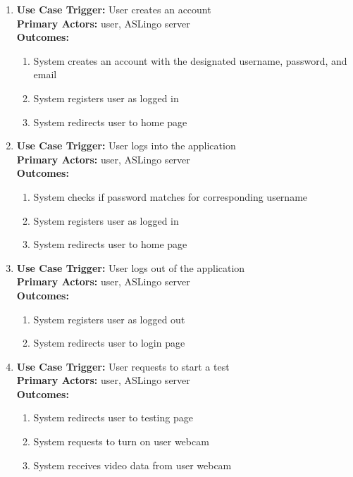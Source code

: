 \documentclass[12pt, titlepage]{article}
\begin{document}
  \begin{enumerate}
      \item 
      \textbf{Use Case Trigger:} User creates an account\\
      \textbf{Primary Actors:} user, ASLingo server\\
      \textbf{Outcomes:}
      \begin{enumerate}
          \item System creates an account with the designated username, password, and email
          \item System registers user as logged in
          \item System redirects user to home page
      \end{enumerate}

      \item
      \textbf{Use Case Trigger:} User logs into the application\\
      \textbf{Primary Actors:} user, ASLingo server\\
      \textbf{Outcomes:}
      \begin{enumerate}
          \item System checks if password matches for corresponding username
          \item System registers user as logged in
          \item System redirects user to home page
      \end{enumerate}
      
      \item
      \textbf{Use Case Trigger:} User logs out of the application\\
      \textbf{Primary Actors:} user, ASLingo server\\
      \textbf{Outcomes:}
      \begin{enumerate}
          \item System registers user as logged out
          \item System redirects user to login page
      \end{enumerate}

      \item
      \textbf{Use Case Trigger:} User requests to start a test\\
      \textbf{Primary Actors:} user, ASLingo server\\
      \textbf{Outcomes:}
      \begin{enumerate}
          \item System redirects user to testing page
          \item System requests to turn on user webcam
          \item System receives video data from user webcam
      \end{enumerate}


\end{enumerate}
\end{document}
